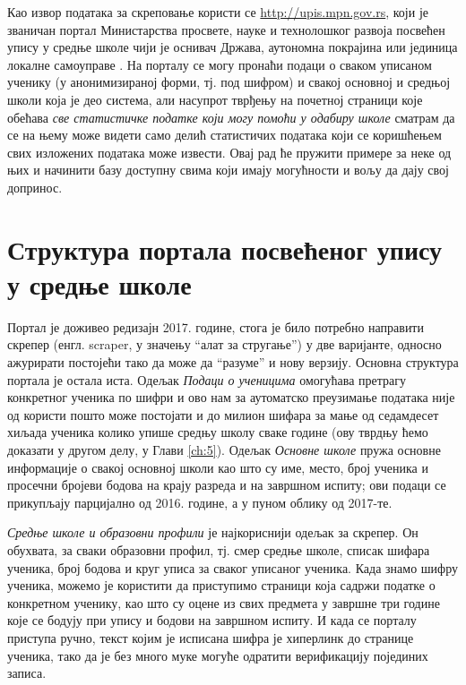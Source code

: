 Као извор података за скреповање користи се \url{http://upis.mpn.gov.rs}, који је званичан портал Министарства просвете, науке и технолошког развоја посвећен упису у средње школе чији је оснивач Држава, аутономна покрајина или јединица локалне самоуправе \citep{upismpn}. На порталу се могу пронаћи подаци о сваком уписаном ученику (у анонимизираној форми, тј. под шифром) и свакој основној и средњој школи која је део система, али насупрот тврђењу на почетној страници које обећава \emph{све статистичке податке који могу помоћи у одабиру школе} \citep{upismpn} сматрам да се на њему може видети само делић статистичих података који се коришћењем свих изложених података може извести. Овај рад ће пружити примере за неке од њих и начинити базу доступну свима који имају могућности и вољу да дају свој допринос.

\section{Структура портала посвећеног упису у средње школе}

Портал је доживео редизајн 2017. године, стога је било потребно направити скрепер (енгл. scraper, у значењу \enquote{алат за стругање}) у две варијанте, односно ажурирати постојећи тако да може да \enquote{разуме} и нову верзију. Основна структура портала је остала иста. Одељак \textit{Подаци о ученицима} омогућава претрагу конкретног ученика по шифри и ово нам за аутоматско преузимање података није од користи пошто може постојати и до милион шифара за мање од седамдесет хиљада ученика колико упише средњу школу сваке године (ову тврдњу ћемо доказати у другом делу, у Глави \ref{ch:5}). Одељак \textit{Основне школе} пружа основне информације о свакој основној школи као што су име, место, број ученика и просечни бројеви бодова на крају разреда и на завршном испиту; ови подаци се прикупљају парцијално од 2016. године, а у пуном облику од 2017-те. 

\textit{Средње школе и образовни профили} је најкориснији одељак за скрепер. Он обухвата, за сваки образовни профил, тј. смер средње школе, списак шифара ученика, број бодова и круг уписа за сваког уписаног ученика. Када знамо шифру ученика, можемо је користити да приступимо страници која садржи податке о конкретном ученику, као што су оцене из свих предмета у завршне три године које се бодују при упису и бодови на завршном испиту. И када се порталу приступа ручно, текст којим је исписана шифра је хиперлинк до странице ученика, тако да је без много муке могуће одратити верификацију појединих записа.